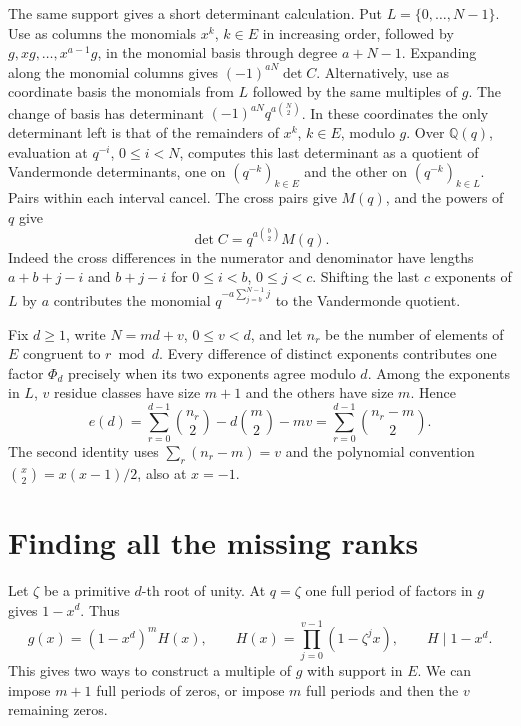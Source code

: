 \documentclass[11pt]{article}
\newcommand{\Q}{\mathbb Q}
\begin{document}
The same support gives a short determinant calculation. Put
\(L=\{0,\ldots,N-1\}\). Use as columns the monomials \(x^k\), \(k\in E\)
in increasing order, followed by \(g,xg,\ldots,x^{a-1}g\), in the
monomial basis through degree \(a+N-1\). Expanding along the monomial
columns gives \((-1)^{aN}\det C\). Alternatively, use as coordinate basis
the monomials from \(L\) followed by the same multiples of \(g\).
The change of basis has determinant
\((-1)^{aN}q^{a\binom N2}\). In these coordinates the only determinant
left is that of the remainders of \(x^k\), \(k\in E\), modulo \(g\).
Over \(\Q(q)\), evaluation at \(q^{-i}\), \(0\le i<N\), computes this
last determinant as a quotient of Vandermonde determinants, one on
\((q^{-k})_{k\in E}\) and the other on \((q^{-k})_{k\in L}\).
Pairs within each interval cancel. The cross pairs give \(M(q)\), and
the powers of \(q\) give
\begin{equation}\label{eq:det}
             \det C=q^{a\binom b2}M(q).
\end{equation}
Indeed the cross differences in the numerator and denominator have
lengths \(a+b+j-i\) and \(b+j-i\) for \(0\le i<b\), \(0\le j<c\).
Shifting the last \(c\) exponents of \(L\) by \(a\) contributes the
monomial \(q^{-a\sum_{j=b}^{N-1}j}\) to the Vandermonde quotient.

Fix \(d\ge1\), write \(N=md+v\), \(0\le v<d\), and let \(n_r\) be the
number of elements of \(E\) congruent to \(r\bmod d\). Every difference
of distinct exponents contributes one factor \(\Phi_d\) precisely when
its two exponents agree modulo \(d\). Among the exponents in \(L\),
\(v\) residue classes have size \(m+1\) and the others have size \(m\).
Hence
\begin{equation}\label{eq:valuation}
 e(d)=\sum_{r=0}^{d-1}\binom{n_r}{2}
          -d\binom m2-mv
     =\sum_{r=0}^{d-1}\binom{n_r-m}{2}.
\end{equation}
The second identity uses \(\sum_r(n_r-m)=v\) and the polynomial
convention \(\binom{x}{2}=x(x-1)/2\), also at \(x=-1\).

\section{Finding all the missing ranks}

Let \(\zeta\) be a primitive \(d\)-th root of unity. At \(q=\zeta\)
one full period of factors in \(g\) gives \(1-x^d\). Thus
\[
      g(x)=(1-x^d)^m H(x),\qquad
      H(x)=\prod_{j=0}^{v-1}(1-\zeta^j x),\qquad H\mid 1-x^d .
\]
This gives two ways to construct a multiple of \(g\) with support in
\(E\). We can impose \(m+1\) full periods of zeros, or impose \(m\)
full periods and then the \(v\) remaining zeros.
\end{document}
